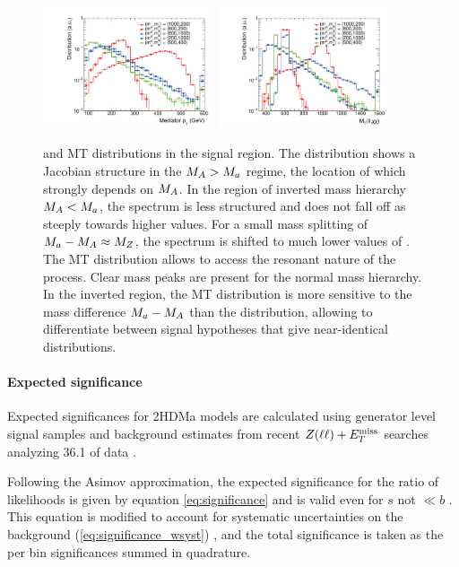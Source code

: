 \begin{figure}
\centering
\includegraphics[width=0.45\textwidth]{texinputs/04_grid/figures/monoz/leptonic/dmwg-final_h_pt_med_dm.pdf}
\includegraphics[width=0.45\textwidth]{texinputs/04_grid/figures/monoz/leptonic/dmwg-final_h_mt_total.pdf}
\caption{\MET and  MT distributions in the signal region. The \MET distribution shows a Jacobian structure in the $M_{A} > M_{a}$ regime, the location of which strongly depends on $M_{A}$. In the region of inverted mass hierarchy $M_{A} < M_{a}$, the spectrum is less structured and does not fall off as steeply towards higher values. For a small mass splitting of $M_{a}-M_{A}\approx M_{Z}$, the spectrum is shifted to much lower values of \MET. The MT distribution allows to access the resonant nature of the process. Clear mass peaks are present for the normal mass hierarchy. In the inverted region, the MT distribution is more sensitive to the mass difference $M_{a}-M_{A}$ than the \MET distribution, allowing to differentiate between signal hypotheses that give near-identical \MET distributions. }
\label{fig:monoz_kin_final}
\end{figure}

\paragraph{Expected significance}

Expected significances for 2HDMa models are calculated using generator level signal samples and background estimates from recent $Z(\ell \ell) + E_T^\mathrm{miss}$ searches analyzing 36.1 \ifb of data \cite{Aaboud:2017bja}.

Following the Asimov approximation, the expected significance for the ratio of likelihoods is given by equation \ref{eq:significance} and is valid even for $s$ not $\ll b$ \cite{Cowan:2010js}.  
This equation is modified to account for systematic uncertainties on the background (\ref{eq:significance_wsyst}) \cite{Cowan:2012}, and the total significance is taken as the per bin significances summed in quadrature.

